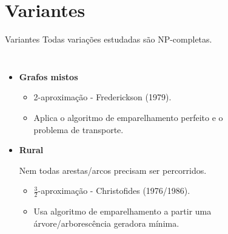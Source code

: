 \documentclass{beamer}
\begin{document}
\section{Variantes}

\begin{frame}{Variantes}
    Todas variações estudadas são NP-completas.

    \begin{columns}

        \begin{itemize}
            \item \textbf{Grafos mistos}
                \begin{itemize}
                    \item 2-aproximação - Frederickson (1979).
                    \item Aplica o algoritmo de emparelhamento perfeito e o problema de transporte.
                \end{itemize}

            \item \textbf{Rural}

                Nem todas arestas/arcos precisam ser percorridos.
                \begin{itemize}
                    \item $\frac{3}{2}$-aproximação - Christofides (1976/1986).  
                    \item Usa algoritmo de emparelhamento a partir uma árvore/arborescência geradora mínima.
                \end{itemize}

        \end{itemize}


        \begin{figure}
            \centering
        \end{figure}
        

\end{columns}
\end{frame}
\end{document}
